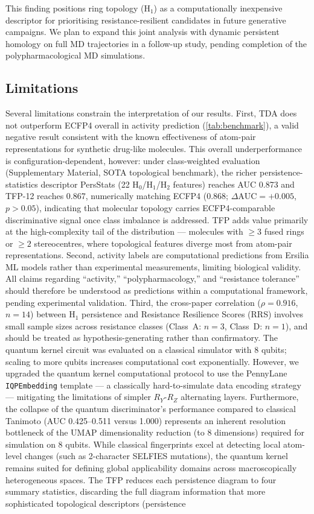 \documentclass[11pt,a4paper]{article}
\begin{document}
This finding positions ring topology (H$_1$) as a computationally inexpensive descriptor for prioritising resistance-resilient candidates in future generative campaigns. We plan to expand this joint analysis with dynamic persistent homology on full MD trajectories in a follow-up study, pending completion of the polypharmacological MD simulations.

\subsection{Limitations}

Several limitations constrain the interpretation of our results. First, TDA does not outperform ECFP4 overall in activity prediction (\cref{tab:benchmark}), a valid negative result consistent with the known effectiveness of atom-pair representations for synthetic drug-like molecules. This overall underperformance is configuration-dependent, however: under class-weighted evaluation (Supplementary Material, SOTA topological benchmark), the richer persistence-statistics descriptor PersStats (22 H$_0$/H$_1$/H$_2$ features) reaches AUC \num{0.873} and TFP-12 reaches \num{0.867}, numerically matching ECFP4 (\num{0.868}; $\Delta\text{AUC} = +0.005$, $p > \num{0.05}$), indicating that molecular topology carries ECFP4-comparable discriminative signal once class imbalance is addressed. TFP adds value primarily at the high-complexity tail of the distribution --- molecules with $\geq 3$ fused rings or $\geq 2$ stereocentres, where topological features diverge most from atom-pair representations. Second, activity labels are computational predictions from Ersilia ML models rather than experimental measurements, limiting biological validity. All claims regarding ``activity,'' ``polypharmacology,'' and ``resistance tolerance'' should therefore be understood as predictions within a computational framework, pending experimental validation. Third, the cross-paper correlation ($\rho = 0.916$, $n = 14$) between H$_1$ persistence and Resistance Resilience Scores (RRS) involves small sample sizes across resistance classes (Class~A: $n = 3$, Class~D: $n = 1$), and should be treated as hypothesis-generating rather than confirmatory. The quantum kernel circuit was evaluated on a classical simulator with 8 qubits; scaling to more qubits increases computational cost exponentially. However, we upgraded the quantum kernel computational protocol to use the PennyLane \texttt{IQPEmbedding} template --- a classically hard-to-simulate data encoding strategy --- mitigating the limitations of simpler $R_Y$-$R_Z$ alternating layers. Furthermore, the collapse of the quantum discriminator's performance compared to classical Tanimoto (AUC 0.425--0.511 versus 1.000) represents an inherent resolution bottleneck of the UMAP dimensionality reduction (to 8 dimensions) required for simulation on 8 qubits. While classical fingerprints excel at detecting local atom-level changes (such as 2-character SELFIES mutations), the quantum kernel remains suited for defining global applicability domains across macroscopically heterogeneous spaces. The TFP reduces each persistence diagram to four summary statistics, discarding the full diagram information that more sophisticated topological descriptors (persistence 
\end{document}
